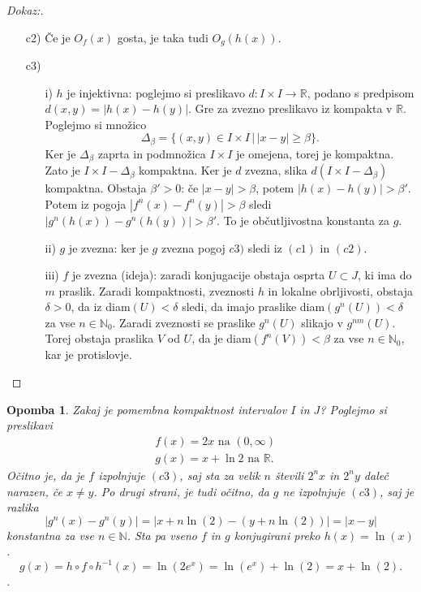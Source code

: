 \documentclass{article}
\newtheorem{opomba}{Opomba}
\newcommand{\N}{\mathbb{N}}
\newcommand{\R}{\mathbb{R}}
\begin{document}
\begin{proof}[Dokaz:]
\begin{enumerate}
\begin{center}
\begin{tikzpicture}
        \end{tikzpicture}
     \end{center}
\item[c2)] Če je $O_f(x)$ gosta, je taka tudi $O_g(h(x))$.
\item[c3)] 
\begin{enumerate}
    \item[i)] $h$ je injektivna: 
poglejmo si preslikavo $d: I\times I \rightarrow \R$, podano s predpisom $d(x, y) = |h(x) - h(y)|$. 
Gre za zvezno preslikavo iz kompakta v $\R$. Poglejmo si množico
$$
\Delta_\beta = \{(x, y)\in I\times I \,|\, |x-y| \geq \beta\}.
$$
Ker je $\Delta_\beta$ zaprta in podmnožica $I\times I$ je omejena, torej je kompaktna.
Zato je $I\times I - \Delta_\beta$ kompaktna. Ker je $d$ zvezna, slika $d(I\times I - \Delta_\beta)$
kompaktna. Obstaja $\beta' > 0$: če $|x - y|> \beta$, potem $|h(x) - h(y)| > \beta'$.
Potem iz pogoja $|f^n(x) - f^n(y)| > \beta$ sledi $|g^n(h(x)) - g^n(h(y))| > \beta'$. To je občutljivostna konstanta za $g$.
\item[ii)] $g$ je zvezna: ker je $g$ zvezna pogoj $c3)$ sledi iz $(c1)$ in $(c2)$.
\item[iii)] $f$ je zvezna (ideja): zaradi konjugacije obstaja osprta $U \subset J$, ki ima 
do $m$ praslik. Zaradi kompaktnosti, zveznosti $h$ in lokalne obrljivosti, obstaja 
$\delta > 0$, da iz diam$(U) < \delta$ sledi, da imajo praslike diam$(g^n(U)) < \delta$
za vse $n\in \N_0$. Zaradi zveznosti se praslike $g^n(U)$ slikajo v $g^{nm}(U)$. 
Torej obstaja praslika $V$ od $U$, da je diam$(f^n(V))< \beta$ za vse $n\in \N_0$, 
kar je protislovje. 
\end{enumerate}
\end{enumerate}
\end{proof}

\begin{opomba}
Zakaj je pomembna kompaktnost intervalov $I$ in $J$? Poglejmo si preslikavi 
\begin{align*}
&f(x) = 2x \text{ na } (0, \infty) \\ 
&g(x) = x + \ln 2 \text{ na } \R.
\end{align*}
Očitno je, da je $f$ izpolnjuje $(c3)$, saj sta za velik $n$ števili $2^n x$ in $2^n y$ daleč narazen, če $x\neq y$. Po drugi strani, je tudi očitno, da $g$ ne izpolnjuje $(c3)$, saj je razlika 
$$
|g^n(x) - g^n(y)| = |x + n\ln(2) - (y + n\ln(2))| = |x-y|
$$
konstantna za vse $n\in \N$. Sta pa vseno $f$ in $g$ konjugirani preko $h(x) = \ln(x)$.
$$
g(x) = h\circ f\circ h^{-1}(x) = \ln(2e^x) = \ln(e^x) + \ln(2) = x + \ln(2).
$$.
\end{opomba}
\end{document}
